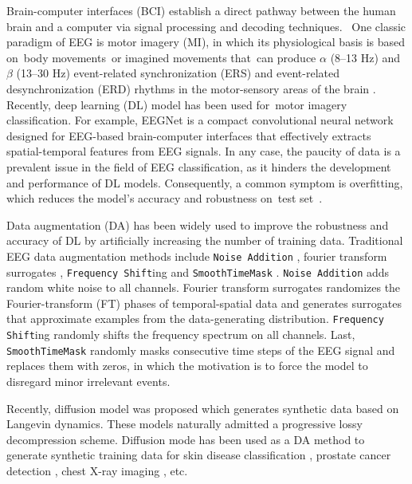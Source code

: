 \documentclass[runningheads]{llncs}
\begin{document}
Brain-computer interfaces (BCI) establish a direct pathway between the human brain and a computer via signal processing and decoding techniques.  One classic paradigm of EEG is motor imagery (MI), in which its physiological basis is based on body movements or imagined movements that can produce $\alpha$ (8–13 Hz) and $\beta$ (13–30 Hz) event-related synchronization (ERS) and event-related desynchronization (ERD) rhythms in the motor-sensory areas of the brain \cite{wolpaw2013brain}. Recently, deep learning (DL) model has been used for motor imagery classification. For example, EEGNet \cite{lawhern2018eegnet} is a compact convolutional neural network designed for EEG-based brain-computer interfaces that effectively extracts spatial-temporal features from EEG signals. In any case, the paucity of data is a prevalent issue in the field of EEG classification, as it hinders the development and performance of DL models.  Consequently, a common symptom is overfitting, which reduces the model's accuracy and robustness on test set \cite{bilbao2017overfitting}. 

Data augmentation (DA) has been widely used to improve the robustness and accuracy of DL by artificially increasing the number of training data.  Traditional EEG data augmentation methods include \texttt{Noise Addition} \cite{wang2018data,parvan2019transfer,li2019channel}, fourier transform surrogates \cite{schwabedal2018addressing}, \texttt{Frequency Shift}ing \cite{rommel2021cadda,rommel2022data} and \texttt{\texttt{SmoothTimeMask}} \cite{mohsenvand2020contrastive}. 
\texttt{Noise Addition} \cite{li2019channel,parvan2019transfer} adds random white noise to all channels.  Fourier transform surrogates \cite{schwabedal2018addressing} randomizes the Fourier-transform (FT) phases of temporal-spatial data and generates surrogates that approximate examples from the data-generating distribution. \texttt{Frequency Shift}ing \cite{rommel2021cadda,rommel2022data} randomly shifts the frequency spectrum on all channels. Last, \texttt{\texttt{SmoothTimeMask}} \cite{mohsenvand2020contrastive} randomly masks consecutive time steps of the EEG signal and replaces them with zeros, in which the motivation is to force the model to disregard minor irrelevant events.

Recently, diffusion model \cite{ho2020denoising} was proposed which generates synthetic data based on Langevin dynamics. These models naturally admitted a progressive lossy decompression scheme. 
Diffusion mode has been used as a DA method to generate synthetic training data for skin disease classification \cite{akrout2023diffusion}, prostate cancer detection \cite{hao2021comprehensive}, chest X-ray imaging \cite{motamed2021data}, etc.   
\end{document}
